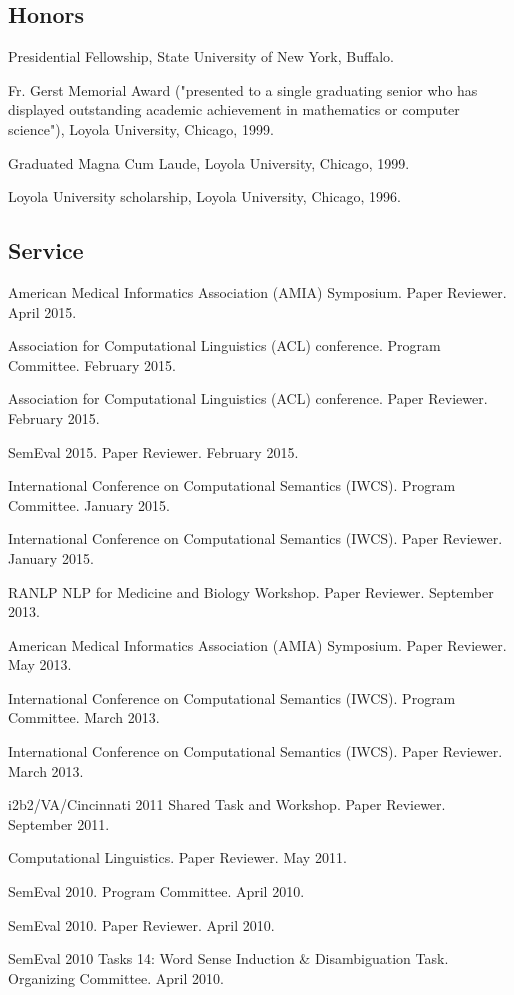 \documentclass[letterpaper]{article}
\renewenvironment{itemize}{
  \begin{list}{}{
    \setlength{\leftmargin}{1.5em}
  }
}{
  \end{list}
}
\begin{document}
\subsection*{Honors}
\begin{itemize}
\item Presidential Fellowship, State University of New York, Buffalo. 
\item Fr. Gerst Memorial Award ("presented to a single graduating senior who has displayed outstanding academic achievement in mathematics or computer science"), Loyola University, Chicago, 1999.
\item Graduated Magna Cum Laude, Loyola University, Chicago, 1999.
\item Loyola University scholarship, Loyola University, Chicago, 1996.
\end{itemize}

\subsection*{Service}

\begin{itemize}
\item American Medical Informatics Association (AMIA) Symposium. Paper Reviewer. April 2015.
\item Association for Computational Linguistics (ACL) conference. Program Committee. February 2015.
\item Association for Computational Linguistics (ACL) conference. Paper Reviewer. February 2015.
\item SemEval 2015. Paper Reviewer. February 2015.
\item International Conference on Computational Semantics (IWCS). Program Committee. January 2015.
\item International Conference on Computational Semantics (IWCS). Paper Reviewer. January 2015.
\item RANLP NLP for Medicine and Biology Workshop. Paper Reviewer. September 2013.
\item American Medical Informatics Association (AMIA) Symposium. Paper Reviewer. May 2013.
\item International Conference on Computational Semantics (IWCS). Program Committee. March 2013.
\item International Conference on Computational Semantics (IWCS). Paper Reviewer. March 2013.
\item i2b2/VA/Cincinnati 2011 Shared Task and Workshop. Paper Reviewer. September 2011.
\item Computational Linguistics. Paper Reviewer. May 2011.
\item SemEval 2010. Program Committee. April 2010.
\item SemEval 2010. Paper Reviewer. April 2010.
\item SemEval 2010 Tasks 14: Word Sense Induction \& Disambiguation Task. Organizing Committee. April 2010.
\end{itemize}
\end{document}
